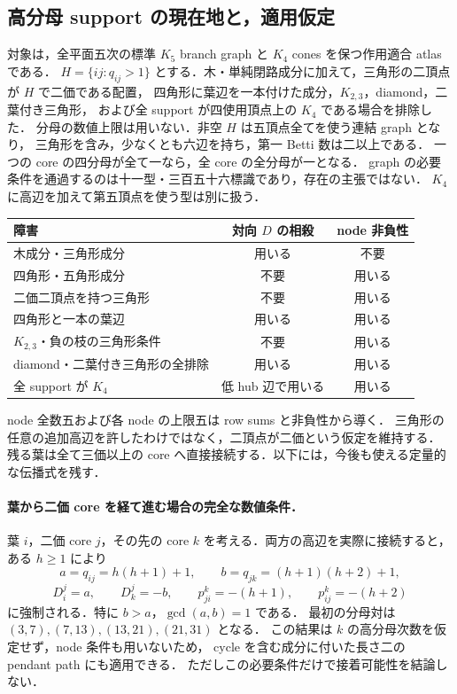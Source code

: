 \subsection{高分母 support の現在地と，適用仮定}
\label{ns17:current-support}

対象は，全平面五次の標準 $K_5$ branch graph と $K_4$ cones を保つ作用適合 atlas である．
$H=\{ij:q_{ij}>1\}$ とする．木・単純閉路成分に加えて，三角形の二頂点が $H$ で二価である配置，
四角形に葉辺を一本付けた成分，$K_{2,3}$，diamond，二葉付き三角形，
および全 support が四使用頂点上の $K_4$ である場合を排除した．
分母の数値上限は用いない．非空 $H$ は五頂点全てを使う連結 graph となり，
三角形を含み，少なくとも六辺を持ち，第一 Betti 数は二以上である．
一つの core の四分母が全て一なら，全 core の全分母が一となる．
graph の必要条件を通過するのは十一型・三百五十六標識であり，存在の主張ではない．
$K_4$ に高辺を加えて第五頂点を使う型は別に扱う．

\begin{center}
\begin{tabular}{lcc}
障害 & 対向 $D$ の相殺 & node 非負性\\\hline
木成分・三角形成分 & 用いる & 不要\\
四角形・五角形成分 & 不要 & 用いる\\
二価二頂点を持つ三角形 & 不要 & 用いる\\
四角形と一本の葉辺 & 用いる & 用いる\\
$K_{2,3}$・負の枝の三角形条件 & 不要 & 用いる\\
diamond・二葉付き三角形の全排除 & 用いる & 用いる\\
全 support が $K_4$ & 低 hub 辺で用いる & 用いる
\end{tabular}
\end{center}
node 全数五および各 node の上限五は row sums と非負性から導く．
三角形の任意の追加高辺を許したわけではなく，二頂点が二価という仮定を維持する．
残る葉は全て三価以上の core へ直接接続する．以下には，今後も使える定量的な伝播式を残す．

\paragraph{葉から二価 core を経て進む場合の完全な数値条件．}
葉 $i$，二価 core $j$，その先の core $k$ を考える．両方の高辺を実際に接続すると，
ある $h\geq1$ により
\[
 a=q_{ij}=h(h+1)+1,\qquad b=q_{jk}=(h+1)(h+2)+1,
\]
\[
 D^j_i=a,\qquad D^j_k=-b,\qquad
 p^k_{ji}=-(h+1),\qquad p^k_{ij}=-(h+2)
\]
に強制される．特に $b>a$，$\gcd(a,b)=1$ である．
最初の分母対は $(3,7),(7,13),(13,21),(21,31)$ となる．
この結果は $k$ の高分母次数を仮定せず，node 条件も用いないため，
cycle を含む成分に付いた長さ二の pendant path にも適用できる．
ただしこの必要条件だけで接着可能性を結論しない．

